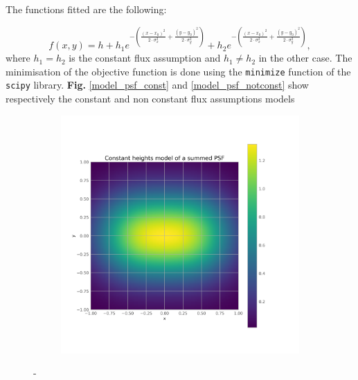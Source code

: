     The functions fitted are the following:

    \begin{equation}
        f(x,y) = h + h_1e^{-\left(\frac{(x-x_0)^2}{2\cdot \sigma_x^2} + \frac{(y-y_0)^2}{2\cdot \sigma_y^2}\right)} +h_2e^{-\left(\frac{(x-x_0)^2}{2\cdot \sigma_x^2} + \frac{(y-y_0)^2}{2\cdot \sigma_y^2}\right)},
    \end{equation}
    where $h_1 = h_2$ is the constant flux assumption and $h_1\neq h_2$ in the other case. The minimisation of the objective function is done using the \texttt{minimize} function of the \texttt{scipy} library. \textbf{Fig.} \ref{model_psf_const} and \ref{model_psf_notconst} show respectively the constant and non constant flux assumptions models
        \begin{figure}[H]
        \centering
        \begin{subfigure}{.45\textwidth}
            \includegraphics[width=\textwidth]{report/Figures/models/model_psf_const.png}
        \end{subfigure}%
        \hspace{1em}-
        \begin{subfigure}{.45\textwidth}
            \centering

\end{subfigure}
\end{figure}
